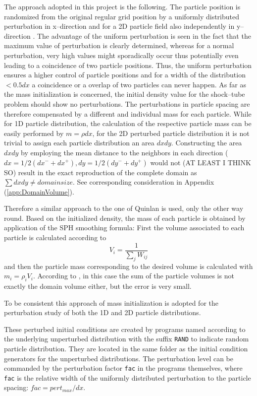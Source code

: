 \documentclass{report}
\begin{document}
 The approach adopted in this project is the following. The particle position is randomized from the original regular grid position by a uniformly distributed perturbation in x--direction and for a 2D particle field also independently in y--direction . The advantage of the uniform perturbation is seen in the fact that the maximum value of perturbation is clearly determined, whereas for a normal perturbation, very high values might sporadically occur thus potentially even leading to a coincidence of two particle positions.                                             
 Thus, the uniform perturbation ensures a higher control of particle positions and for a width of the distribution $<0.5dx$ a coincidence or a overlap of two particles can never happen. As far as the mass initialization is concerned, the initial density value for the shock--tube problem should show no perturbations. The perturbations in particle spacing are therefore compensated by a different and individual mass for each particle. While for 1D particle distribution, the calculation of the respective particle mass can be easily performed by $m=\rho dx$, for the 2D perturbed particle distribution it is not trivial to assign each particle distribution an area $dx dy$. Constructing the area $dx dy$ by employing the mean distance to the neighbors in each direction ($dx=1/2(dx^-+dx^+),dy=1/2(dy^-+dy^+)$ would not (AT LEAST I THINK SO) result in the exact reproduction of the complete domain as $\sum dxdy\neq domain size$. See corresponding consideration in Appendix (\ref{app:DomainVolume}).

 Therefore a similar approach to the one of Quinlan \cite{Quinlan2006} is used, only the other way round. Based on the initialized density, the mass of each particle is obtained by application of the SPH smoothing formula: First the volume associated to each particle is calculated according to
 \begin{equation}
  V_i=\frac{1}{\sum_j W_{ij}}
 \end{equation}
 and then the particle mass corresponding to the desired volume is calculated with $m_i=\rho_i V_i$. According to \cite{Espanol2003}, in this case the sum of the particle volumes is not exactly the domain volume either, but the error is very small.

 To be consistent this approach of mass initialization is adopted for the perturbation study of both the 1D and 2D particle distributions.

 These perturbed initial conditions are created by programs named according to the underlying unperturbed distribution with the suffix {\tt RAND} to indicate random particle distribution. They are located in the same folder as the initial condition generators for the unperturbed distributions. The perturbation level can be commanded by the perturbation factor {\tt fac} in the programs themselves, where {\tt fac} is the relative width of the uniformly distributed perturbation to the particle spacing: $\mathit{fac}=\mathit{pert_{max}}/dx$.
\end{document}
